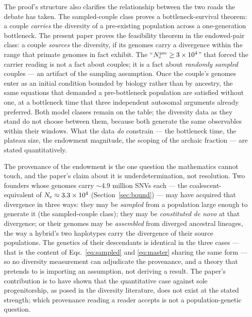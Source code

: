 The proof's structure also clarifies the relationship between the two
roads the debate has taken. The sampled-couple class proves a
bottleneck-survival theorem: a couple \emph{carries} the diversity of a
pre-existing population across a
one-generation bottleneck. The present paper proves the feasibility
theorem in the endowed-pair class: a couple \emph{sources} the diversity,
if its genomes carry a divergence within the range that primate genomes
in fact exhibit. The ``$N_{\mathrm{e}}^{\mathrm{pre}} \ge 3\times10^{4}$'' that forced the
carrier reading is not a fact about couples; it is a fact about
\emph{randomly sampled} couples --- an artifact of the sampling
assumption. Once the couple's genomes enter as an initial condition bounded
by biology rather than by ancestry, the same equations that demanded a
pre-bottleneck population are satisfied without one, at a bottleneck time
that three independent autosomal arguments already preferred. Both model
classes remain on the table; the diversity data as they stand do not
choose between them, because both generate the same observables within
their windows. What the data \emph{do} constrain --- the bottleneck time,
the plateau size, the endowment magnitude, the scoping of the archaic
fraction --- are stated quantitatively.

The provenance of the endowment is the one question the mathematics
cannot touch, and the paper's claim about it is underdetermination, not
resolution. Two founders whose genomes carry $\sim$4.9 million SNVs
each --- the coalescent-equivalent of $N_{\mathrm{e}} \approx 3.3\times10^{4}$
(Section~\ref{sec:bound}) --- may have acquired that divergence in three
ways: they may be \emph{sampled} from a population large enough to
generate it (the sampled-couple class); they may be \emph{constituted de
novo} at that divergence; or their genomes may be \emph{assembled} from
diverged ancestral lineages, the way a hybrid's two haplotypes carry the
divergence of their source populations. The genetics of their
descendants is identical in the three cases --- that is the content of
Eqs.~\eqref{eq:sampled} and \eqref{eq:master} sharing the same form ---
so no diversity measurement can adjudicate the provenance, and a theory
that pretends to is importing an assumption, not deriving a result. The
paper's contribution is to have shown that the quantitative case against
sole progenitorship, as posed in the diversity literature, does not exist
at the stated strength; which provenance reading a reader accepts is not
a population-genetic question.

